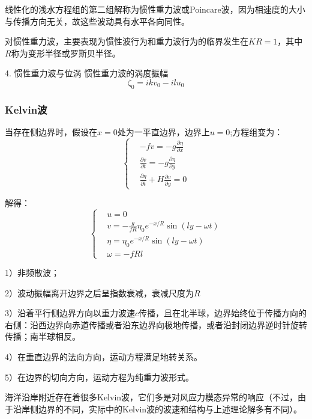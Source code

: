 \documentclass{article}
\begin{document}
线性化的浅水方程组的第二组解称为惯性重力波或Poincare波，因为相速度的大小与传播方向无关，故这些波动具有水平各向同性。

对惯性重力波，主要表现为惯性波行为和重力波行为的临界发生在$KR=1$，其中$R$称为变形半径或罗斯贝半径。

4. 惯性重力波与位涡
惯性重力波的涡度振幅
$$\zeta_0=ikv_0-ilu_0$$

\subsubsection{Kelvin波}
当存在侧边界时，假设在$x=0$处为一平直边界，边界上$u=0$;方程组变为：
$$\begin{cases}
    &-fv=-g\frac{\partial \eta}{\partial x}\\
    &\frac{\partial v}{\partial t}=-g\frac{\partial \eta}{\partial y}\\
    &\frac{\partial \eta}{\partial t}+H\frac{\partial v}{\partial y} = 0
\end{cases}$$

解得：
$$\begin{cases}
    &u=0\\
    &v=-\frac{g}{fR}\eta_0e^{-x/R}\sin(ly-\omega t)\\
    &\eta = \eta_0e^{-x/R}\sin(ly-\omega t)\\
    &\omega = -fRl
\end{cases}$$

1）非频散波；

2）波动振幅离开边界之后呈指数衰减，衰减尺度为$R$

3）沿着平行侧边界方向以重力波速$c$传播，且在北半球，边界始终位于传播方向的右侧：沿西边界向赤道传播或者沿东边界向极地传播，或者沿封闭边界逆时针旋转传播；南半球相反。

4）在垂直边界的法向方向，运动方程满足地转关系。

5）在边界的切向方向，运动方程为纯重力波形式。

海洋沿岸附近存在着很多Kelvin波，它们多是对风应力模态异常的响应（不过，由于沿岸侧边界的不同，实际中的Kelvin波的波速和结构与上述理论解多有不同）。
\end{document}
